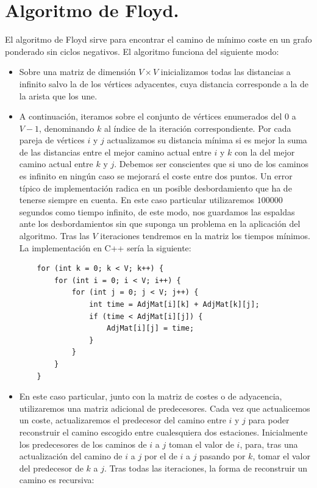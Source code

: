\documentclass[spanish, a4paper, 12pt] {article}
\begin{document}
\section{Algoritmo de Floyd.}
El algoritmo de Floyd sirve para encontrar el camino de mínimo coste en un grafo ponderado sin ciclos negativos. El algoritmo funciona del siguiente modo:
\begin{itemize}
\item{
Sobre una matriz de dimensión $V\times V$ inicializamos todas las distancias a infinito salvo la de los vértices adyacentes, cuya distancia corresponde a la de la arista que los une.
}
\item{
A continuación, iteramos sobre el conjunto de vértices enumerados del $0$ a $V - 1$, denominando $k$ al índice de la iteración correspondiente. Por cada pareja de vértices $i$ y $j$ actualizamos su distancia mínima si es mejor la suma de las distancias entre el mejor camino actual entre $i$ y $k$ con la del mejor camino actual entre $k$ y $j$. Debemos ser conscientes que si uno de los caminos es infinito en ningún caso se mejorará el coste entre dos puntos. Un error típico de implementación radica en un posible desbordamiento que ha de tenerse siempre en cuenta.
En este caso particular utilizaremos $100000$ segundos como tiempo infinito, de este modo, nos guardamos las espaldas ante los desbordamientos sin que suponga un problema en la aplicación del algoritmo. Tras las $V$ iteraciones tendremos en la matriz los tiempos mínimos. La implementación en C++ sería la siguiente:
\begin{verbatim}
    for (int k = 0; k < V; k++) {
        for (int i = 0; i < V; i++) {
            for (int j = 0; j < V; j++) {
                int time = AdjMat[i][k] + AdjMat[k][j];
                if (time < AdjMat[i][j]) {
                    AdjMat[i][j] = time;
                }
            }
        }
    }
\end{verbatim}
}
\item{
En este caso particular, junto con la matriz de costes o de adyacencia, utilizaremos una matriz adicional de predecesores. Cada vez que actualicemos un coste, actualizaremos el predecesor del camino entre $i$ y $j$ para poder reconstruir el camino escogido entre cualesquiera dos estaciones. Inicialmente los predecesores de los caminos de $i$ a $j$ toman el valor de $i$, para, tras una actualización del camino de $i$ a $j$ por el de $i$ a $j$ pasando por $k$, tomar el valor del predecesor de $k$ a $j$. Tras todas las iteraciones, la forma de reconstruir un camino es recursiva:
}
\end{itemize}
\end{document}
